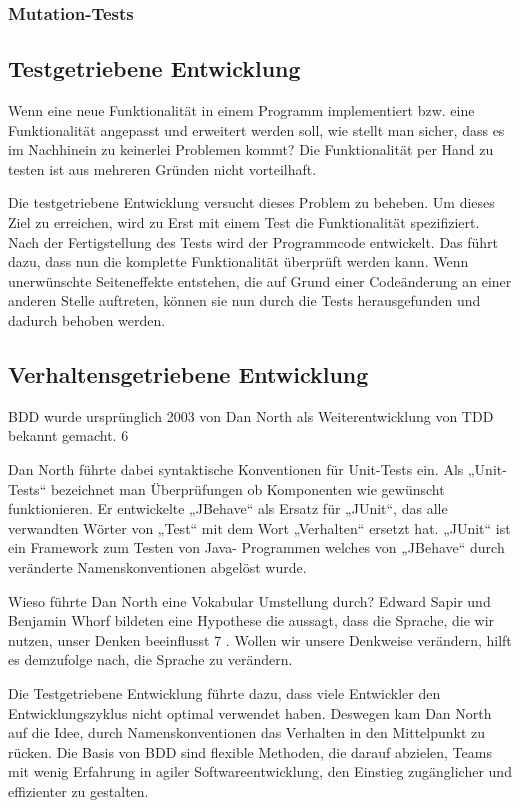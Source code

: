 \subsubsection{Mutation-Tests}

\subsection{Testgetriebene Entwicklung}
Wenn eine neue Funktionalität in einem Programm implementiert bzw. eine Funktionalität angepasst und erweitert werden soll, wie stellt man sicher, dass es im Nachhinein
zu keinerlei Problemen kommt? Die Funktionalität per Hand zu testen ist aus mehreren Gründen nicht vorteilhaft.

Die testgetriebene Entwicklung versucht dieses Problem zu beheben. Um dieses Ziel zu erreichen, wird zu Erst mit einem Test die Funktionalität spezifiziert. Nach der
Fertigstellung des Tests wird der Programmcode entwickelt. Das führt dazu, dass nun die komplette Funktionalität überprüft werden kann. Wenn unerwünschte Seiteneffekte 
entstehen, die auf Grund einer Codeänderung an einer anderen Stelle auftreten, können sie nun durch die Tests herausgefunden und dadurch
behoben werden.

\subsection{Verhaltensgetriebene Entwicklung}
BDD wurde ursprünglich 2003 von Dan North als Weiterentwicklung von TDD bekannt gemacht. 6

Dan North führte dabei syntaktische Konventionen für Unit-Tests ein. Als „Unit-Tests“ bezeichnet man Überprüfungen ob Komponenten wie gewünscht funktionieren. Er
entwickelte „JBehave“ als Ersatz für „JUnit“, das alle verwandten Wörter von „Test“ mit dem Wort „Verhalten“ ersetzt hat. „JUnit“ ist ein Framework zum Testen von Java-
Programmen welches von „JBehave“ durch veränderte Namenskonventionen abgelöst wurde.

Wieso führte Dan North eine Vokabular Umstellung durch? Edward Sapir und Benjamin Whorf bildeten eine Hypothese die aussagt, dass die Sprache, die wir nutzen, unser 
Denken beeinflusst 7 . Wollen wir unsere Denkweise verändern, hilft es demzufolge nach, die Sprache zu verändern.

Die Testgetriebene Entwicklung führte dazu, dass viele Entwickler den Entwicklungszyklus nicht optimal verwendet haben. Deswegen kam Dan North auf die Idee, durch
Namenskonventionen das Verhalten in den Mittelpunkt zu rücken. Die Basis von BDD sind flexible Methoden, die darauf abzielen, Teams mit wenig Erfahrung in agiler 
Softwareentwicklung, den Einstieg zugänglicher und effizienter zu gestalten.


